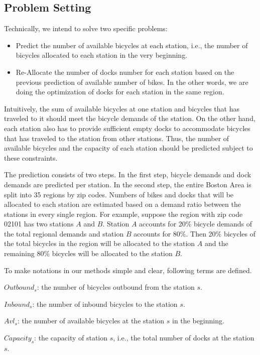 \documentclass[journal, letterpaper]{IEEEtran}
\begin{document}
\subsection{Problem Setting}
Technically, we intend to solve two specific problems:
\begin{itemize}

\item Predict the number of available bicycles at each station, i.e., the number of bicycles allocated to each station in the very beginning. 
\item Re-Allocate the number of docks number for each station based on the previous prediction of available number of bikes. In the other words, we are doing the optimization of docks for each station in the same region. 
\end{itemize} 
Intuitively, the sum of available bicycles at one station and bicycles that has traveled to it should meet the bicycle demands of the station. On the other hand, each station also has to provide sufficient empty docks to accommodate bicycles that has traveled to the station from other stations. Thus, the number of available bicycles and the capacity of each station should be predicted subject to these constraints. 

The prediction consists of two steps. In the first step, bicycle demands and dock demands are predicted per station. In the second step, the entire Boston Area is split into 35 regions by zip codes. Numbers of bikes and docks that will be allocated to each station are estimated based on a demand ratio between the stations in every single region. For example, suppose the region with zip code 02101 has two stations $A$ and $B$. Station $A$ accounts for 20\% bicycle demands of the total regional demands and station $B$ accounts for 80\%. Then 20\% bicycles of the total bicycles in the region will be allocated to the station $A$ and the remaining 80\% bicycles will be allocated to the station $B$.     

To make notations in our methods simple and clear, following terms are defined. 

$Outbound_{s}$: the number of bicycles outbound from the station $s$.

$Inbound_{s}$: the number of inbound bicycles to the station $s$. 

$Avl_{s}$: the number of available bicycles at the station $s$ in the beginning. 

$Capacity_{s}$: the capacity of station $s$, i.e., the total number of docks at the station $s$. 
\end{document}
